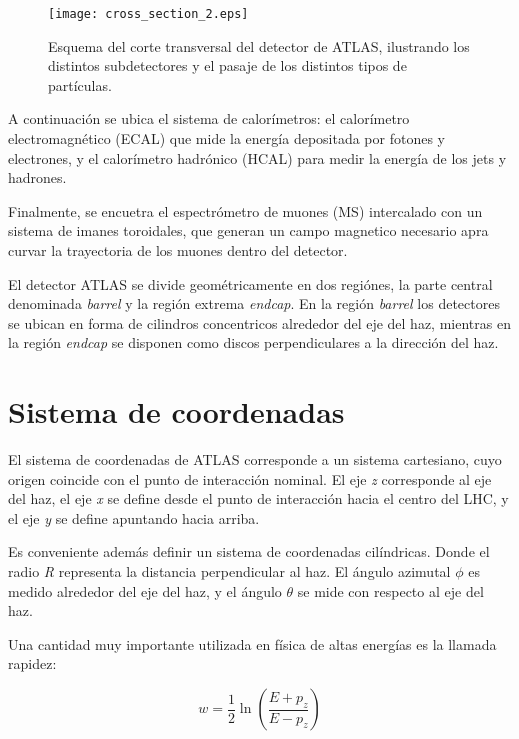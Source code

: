 \begin{figure}
\centering
\texttt{[image: cross\_section\_2.eps]}
\caption{Esquema del corte transversal del detector de ATLAS, ilustrando los distintos subdetectores y el pasaje de los distintos tipos de partículas.}
\label{cross_section_2}
\end{figure}

A continuación se ubica el sistema de calorímetros: el calorímetro electromagnético (ECAL) que mide la energía depositada por fotones y electrones, y el calorímetro hadrónico (HCAL) para medir la energía de los jets y hadrones.

Finalmente, se encuetra el espectrómetro de muones (MS) intercalado con un sistema de imanes toroidales, que generan un campo magnetico necesario apra curvar la trayectoria de los muones dentro del detector.

El detector ATLAS se divide geométricamente en dos regiónes, la parte central denominada \textit{barrel} y la región extrema \textit{endcap}. En la región \textit{barrel} los detectores se ubican en forma de cilindros concentricos alrededor del eje del haz, mientras en la región \textit{endcap} se disponen como discos perpendiculares a la dirección del haz. 

\section{Sistema de coordenadas}

El sistema de coordenadas de ATLAS corresponde a un sistema cartesiano, cuyo origen coincide con el punto de interacción nominal. El eje \textit{z} corresponde al eje del haz, el eje \textit{x} se define desde el punto de interacción hacia el centro del LHC, y el eje \textit{y} se define apuntando hacia arriba.

Es conveniente además definir un sistema de coordenadas cilíndricas. Donde el radio \textit{R} representa la distancia perpendicular al haz. El ángulo azimutal $\phi$ es medido alrededor del eje del haz, y el ángulo $\theta$ se mide con respecto al eje del haz. 

Una cantidad muy importante utilizada en física de altas energías es la llamada rapidez:

\begin{equation}
w=\frac{1}{2}\ln\left( \frac{E+p_{z}}{E-p_{z}}\right)
\end{equation}

